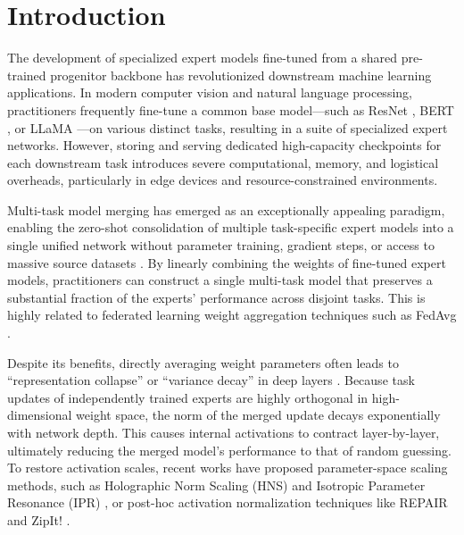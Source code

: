 \documentclass{article}
\begin{document}
\section{Introduction}
\label{submission-introduction}
The development of specialized expert models fine-tuned from a shared pre-trained progenitor backbone has revolutionized downstream machine learning applications. In modern computer vision and natural language processing, practitioners frequently fine-tune a common base model—such as ResNet \cite{he16}, BERT \cite{devlin18}, or LLaMA \cite{touvron23}—on various distinct tasks, resulting in a suite of specialized expert networks. However, storing and serving dedicated high-capacity checkpoints for each downstream task introduces severe computational, memory, and logistical overheads, particularly in edge devices and resource-constrained environments. 

Multi-task model merging has emerged as an exceptionally appealing paradigm, enabling the zero-shot consolidation of multiple task-specific expert models into a single unified network without parameter training, gradient steps, or access to massive source datasets \cite{wortsman22, ilharco23, matena22}. By linearly combining the weights of fine-tuned expert models, practitioners can construct a single multi-task model that preserves a substantial fraction of the experts' performance across disjoint tasks. This is highly related to federated learning weight aggregation techniques such as FedAvg \cite{fedavg17}.

Despite its benefits, directly averaging weight parameters often leads to ``representation collapse'' or ``variance decay'' in deep layers \cite{jordan23, qu25}. Because task updates of independently trained experts are highly orthogonal in high-dimensional weight space, the norm of the merged update decays exponentially with network depth. This causes internal activations to contract layer-by-layer, ultimately reducing the merged model's performance to that of random guessing. To restore activation scales, recent works have proposed parameter-space scaling methods, such as Holographic Norm Scaling (HNS) and Isotropic Parameter Resonance (IPR) \cite{qu25}, or post-hoc activation normalization techniques like REPAIR \cite{jordan23} and ZipIt! \cite{stoica23}. 
\end{document}
